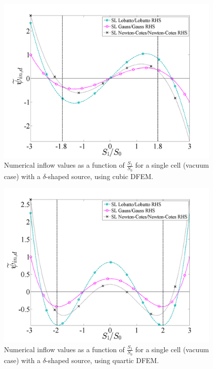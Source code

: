 \begin{figure}[!hbp]
\centering
\includegraphics[width=11cm]{chapter2_constant_xs/Final_Inflow_RHS_Comparison_Source_P3_MFP_0.png}
\caption{Numerical inflow values as a function of $\frac{S_1}{S_0}$ for a single cell (vacuum case) with a $\delta$-shaped source, using cubic DFEM.}
\label{fig:vac_inflow_p3}
\end{figure}
\begin{figure}[!htp]
\centering
\includegraphics[width=11cm]{chapter2_constant_xs/Final_Inflow_RHS_Comparison_Source_P4_MFP_0.png}
\caption{Numerical inflow values as a function of $\frac{S_1}{S_0}$ for a single cell (vacuum case) with a $\delta$-shaped source, using quartic DFEM.}
\label{fig:vac_inflow_p4}
\end{figure}

